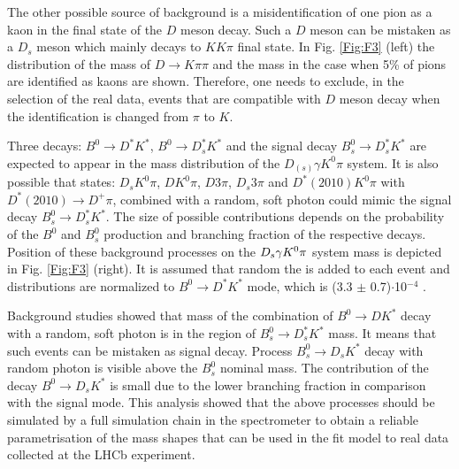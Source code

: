 \documentclass{appolb}
\begin{document}
The other possible source of background is a misidentification of one pion as a kaon in the final state of the $D$ meson decay. Such a $D$ meson can be mistaken as a $D_s$ meson which mainly decays to $K K \pi$ final state. In Fig. \ref{Fig:F3} (left) the distribution of the mass of $D \rightarrow K \pi \pi$ and the mass in the case when 5\% of pions are identified as kaons are shown. Therefore, one needs to exclude, in the selection of the real data, events that are compatible with $D$ meson decay when the identification is changed from $\pi$  to $K$.  

Three decays: $B^0 \rightarrow D^* K^*$, $B^0 \rightarrow D^*_s K^*$ and the signal decay $B_s^0\rightarrow D^*_s K^*$ are expected to appear in the mass distribution of the $D_{(s)} \gamma K^0 \pi$ system. It is also possible that states: $D_s K^0 \pi$, $D K^0 \pi$, $D 3\pi$, $D_s 3\pi$ and  $D^*(2010)K^0 \pi$ with $D^*(2010)\rightarrow D^+ \pi$, combined with a random, soft photon could mimic the signal decay $ B^0_s\rightarrow D^*_s K^*$. The size of possible contributions depends on the probability of the $B^0$ and $B^0_s$ production and branching fraction of the respective decays. Position of these background processes on the $D_s {\gamma} K^0 \pi$ system mass is depicted in Fig. \ref{Fig:F3} (right). It is assumed that random the \g is added to each event and distributions are normalized to $B^0\rightarrow D^*K^*$ mode, which is (3.3 $\pm$ 0.7)$\cdot$10$^{-4}$ \cite{pdg_group}. 

Background studies showed that mass of the combination of  $B^0 \rightarrow DK^*$ decay with a random, soft photon is in the region of  $B_s^0 \rightarrow D^*_s K^*$ mass. It means that such events can be mistaken as signal decay. Process $B_s^0\rightarrow D_s K^*$ decay with random photon is visible above the $B^0_s$ nominal mass.
The contribution of the decay $B^0 \rightarrow D_sK^*$ is small
due to the lower branching fraction in comparison with the signal mode. This analysis showed that the above processes should be simulated by a full simulation chain in the spectrometer to obtain a reliable parametrisation of the mass shapes that can be used in the fit model to real data collected at the LHCb experiment.
\end{document}
